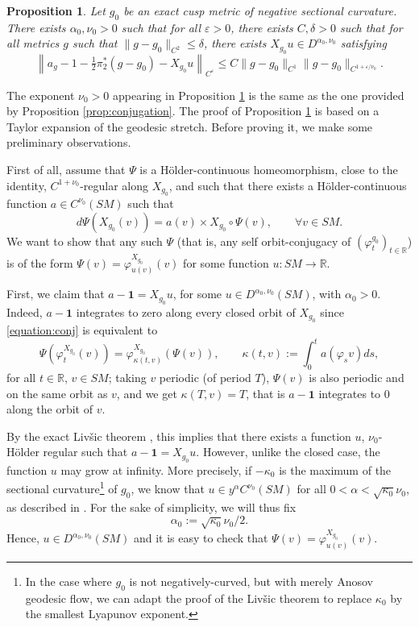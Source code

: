 \documentclass[JEP,XML,SOM,Unicode,NoFloatCountersInSection]{cedram}
\newcommand{\R}{\mathbb{R}}
\newcommand{\eps}{\varepsilon}
\theoremstyle{plain}
\newtheorem{proposition}{Proposition}[section]
\theoremstyle{definition}
\begin{document}
\begin{proposition}\label{thm:estimate-stretch}
Let $g_0$ be an exact cusp metric of negative sectional curvature. There exists $\alpha_0,\nu_0 > 0$ such that for all $\eps > 0$, there exists $C, \delta > 0$ such that for all metrics $g$ such that $\|g-g_0\|_{C^2} \leq \delta$, there exists $X_{g_0} u\in D^{\alpha_0,\nu_0}$ satisfying
\[
\left\| a_{g} - 1 - \tfrac{1}{2} \pi_2^\ast (g-g_0) - X_{g_0} u \right\|_{C^{\eps}} \leq C \| g-g_0 \|_{C^{1}} \| g-g_0\|_{C^{1+\eps/\nu_0}}.
\]
\end{proposition}

The exponent $\nu_0 > 0$ appearing in Proposition \ref{thm:estimate-stretch} is the same as the one provided by Proposition \ref{prop:conjugation}. The proof of Proposition \ref{thm:estimate-stretch} is based on a Taylor expansion of the geodesic stretch. Before proving it, we make some preliminary observations.

First of all, assume that $\Psi$ is a H\"older-continuous homeomorphism, close to the identity, $C^{1+\nu_0}$-regular along $X_{g_0}$, and such that there exists a H\"older-continuous function $a \in C^{\nu_0}(SM)$ such that
\begin{equation}
\label{equation:conj}
d \Psi (X_{g_0}(v))= a(v) \times X_{g_0}\circ \Psi(v), \qquad \forall v \in SM.
\end{equation}
{\color{black}We want to show that any such $\Psi$ (that is, any self orbit-conjugacy of $(\varphi^{g_0}_t)_{t \in \R}$) is of the form $\Psi(v) = \varphi^{X_{g_0}}_{u(v)}(v)$ for some function $u : SM \to \R$.}

First, we claim that $a-\mathbf{1} = X_{g_0}u$, for some $u \in D^{\alpha_0,\nu_0}(SM)$, with $\alpha_0 > 0$. {\color{black}Indeed, $a-\mathbf{1}$ integrates to zero along every closed orbit of $X_{g_0}$ since \eqref{equation:conj} is equivalent to
\[
\Psi(\varphi_t^{X_{g_0}}(v)) = \varphi^{X_{g_0}}_{\kappa(t,v)}(\Psi(v)), \qquad \kappa(t,v) := \int_0^t a(\varphi_s v) ds,
\]
for all $t \in \R$, $v \in SM$; taking $v$ periodic (of period $T$), $\Psi(v)$ is also periodic and on the same orbit as $v$, and we get $\kappa(T,v)=T$, that is $a-\mathbf{1}$ integrates to $0$ along the orbit of $v$.}

By the exact Liv\v{s}ic theorem \cite[Th.\,5]{Bonthonneau-Lefeuvre-19-1}, this implies that there exists a function $u$, $\nu_0$-Hölder regular such that $a-\mathbf{1}=X_{g_0}u$. However, unlike the closed case, the function $u$ may grow at infinity. More precisely, if $-\kappa_0$ is the maximum of the sectional curvature\footnote{In the case where $g_0$ is not negatively-curved, but with merely Anosov geodesic flow, we can adapt the proof of the Liv\v{s}ic theorem to replace $\kappa_0$ by the smallest Lyapunov exponent.} of $g_0$, we know that $u\in y^\alpha C^{\nu_0}(SM)$ for all $0<\alpha < \sqrt{\kappa_0}\nu_0$, as described in \cite[Th.\,5]{Bonthonneau-Lefeuvre-19-1}. For the sake of simplicity, we will thus fix
\begin{equation}\label{eq:def-alpha}
\alpha_0 := \sqrt{\kappa_0}\nu_0/2.
\end{equation}
{\color{black}Hence, $u \in D^{\alpha_0,\nu_0}(SM)$ and it is easy to check that $\Psi(v) = \varphi^{X_{g_0}}_{u(v)}(v)$.}
\end{document}
